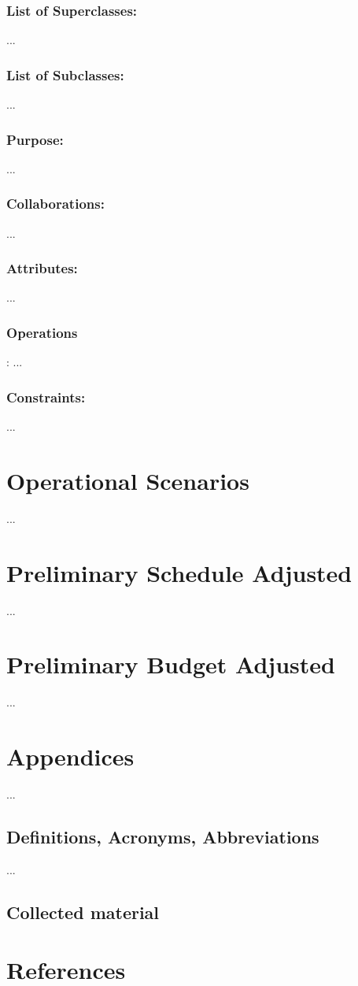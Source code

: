 \documentclass[]{article}
\begin{document}
\subsubsection {List of Superclasses:} 
... 
\subsubsection {List of Subclasses:} 
... 
\subsubsection {Purpose: }
... 
\subsubsection {Collaborations: }
... 
\subsubsection {Attributes: }
... 
\subsubsection {Operations}: 
... 
\subsubsection {Constraints:} 
... 

\section{Operational Scenarios}
... 

\section{Preliminary Schedule Adjusted}
... 
\section{Preliminary Budget Adjusted}
... 
\section{Appendices}
... 
\subsection{Definitions, Acronyms, Abbreviations}
... 
\subsection{Collected material}

\section {References}



\end{document}
